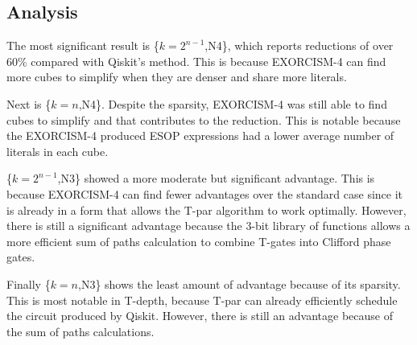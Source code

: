 \subsection{Analysis}
The most significant result is \{$k=2^{n-1}$,N4\}, which reports reductions of over 60\% compared
with Qiskit's method. This is because EXORCISM-4 can find more cubes to simplify when they are
denser and share more literals.

Next is \{$k=n$,N4\}. Despite the sparsity, EXORCISM-4 was still able to find cubes to simplify
and that contributes to the reduction. This is notable because the EXORCISM-4 produced ESOP
expressions had a lower average number of literals in each cube.

\{$k=2^{n-1}$,N3\} showed a more moderate but significant advantage. This is because EXORCISM-4
can find fewer advantages over the standard case since it is already in a form that allows
the T-par algorithm to work optimally. However, there is still a significant advantage because
the 3-bit library of functions allows a more efficient sum of paths calculation to combine
T-gates into Clifford phase gates.

Finally \{$k=n$,N3\} shows the least amount of advantage because of its sparsity. This is most
notable in T-depth, because T-par can already efficiently schedule the circuit produced by Qiskit.
However, there is still an advantage because of the sum of paths calculations.


\label{Exp:An}


